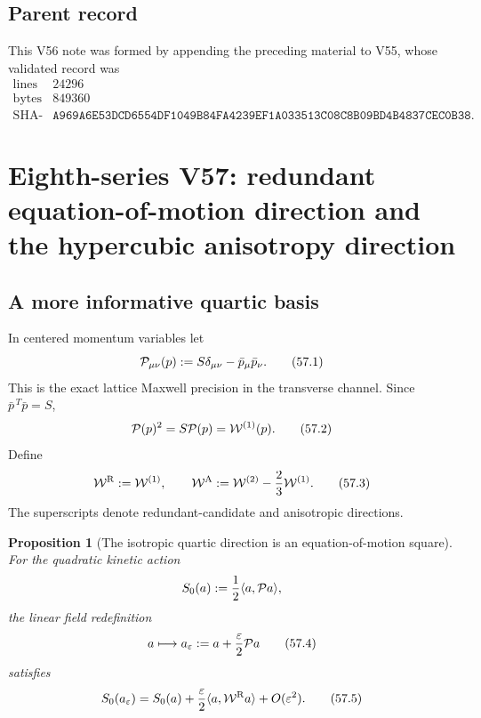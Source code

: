 \documentclass[11pt,oneside]{book}
\newtheorem{proposition}[theorem]{Proposition}
\theoremstyle{definition}
\theoremstyle{remark}
\begin{document}
\subsection{Parent record}

This V56 note was formed by appending the preceding material to V55,
whose validated record was
\[
\begin{array}{c|c}
\text{lines}&24296\\
\text{bytes}&849360\\
\text{SHA-256}&
\texttt{A969A6E53DCD6554DF1049B84FA4239EF1A033513C08C8B09BD4B4837CEC0B38}.
\end{array}
\]



\section{Eighth-series V57: redundant equation-of-motion direction
and the hypercubic anisotropy direction}
\label{sec:e8v57}

\subsection{A more informative quartic basis}

In centered momentum variables let
\[
 {\cal P}_{\mu\nu}(p)
 :=S\delta_{\mu\nu}-\bar p_\mu\bar p_\nu.                    \tag{57.1}
\]
This is the exact lattice Maxwell precision in the transverse
channel.  Since \(\bar p^{\,T}\bar p=S\),
\[
 {\cal P}(p)^2=S{\cal P}(p)={\cal W}^{(1)}(p).                \tag{57.2}
\]
Define
\[
 {\cal W}^{\rm R}:={\cal W}^{(1)},\qquad
 {\cal W}^{\rm A}:={\cal W}^{(2)}
                   -\frac23{\cal W}^{(1)}.                   \tag{57.3}
\]
The superscripts denote redundant-candidate and anisotropic
directions.

\begin{proposition}[The isotropic quartic direction is an
equation-of-motion square]
\label{prop:e8v57-EOM-square}
For the quadratic kinetic action
\[
 S_0(a):=\frac12\langle a,{\cal P}a\rangle,
\]
the linear field redefinition
\[
 a\longmapsto a_\varepsilon
 :=a+\frac{\varepsilon}{2}{\cal P}a                           \tag{57.4}
\]
satisfies
\[
 S_0(a_\varepsilon)
 =S_0(a)+\frac{\varepsilon}{2}
 \langle a,{\cal W}^{\rm R}a\rangle+O(\varepsilon^2).         \tag{57.5}
\]
\end{proposition}
\end{document}
